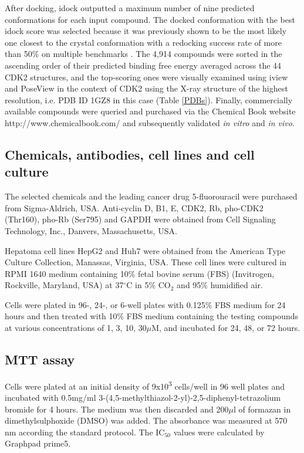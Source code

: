 \documentclass[10pt]{article}
\begin{document}
After docking, idock outputted a maximum number of nine predicted conformations for each input compound. The docked conformation with the best idock score was selected because it was previously shown to be the most likely one closest to the crystal conformation with a redocking success rate of more than 50\% on multiple benchmarks \cite{1362}. The 4,914 compounds were sorted in the ascending order of their predicted binding free energy averaged across the 44 CDK2 structures, and the top-scoring ones were visually examined using iview \cite{1366} and PoseView \cite{748} in the context of CDK2 using the X-ray structure of the highest resolution, i.e. PDB ID 1GZ8 in this case (Table \ref{PDBs}). Finally, commercially available compounds were queried and purchased via the Chemical Book website http://www.chemicalbook.com/ and subsequently validated \textit{in vitro} and \textit{in vivo}.

\subsection*{Chemicals, antibodies, cell lines and cell culture}

The selected chemicals and the leading cancer drug 5-fluorouracil were purchased from Sigma-Aldrich, USA. Anti-cyclin D, B1, E, CDK2, Rb, pho-CDK2 (Thr160), pho-Rb (Ser795) and GAPDH were obtained from Cell Signaling Technology, Inc., Danvers, Massachusetts, USA.

Hepatoma cell lines HepG2 and Huh7 were obtained from the American Type Culture Collection, Manassas, Virginia, USA. These cell lines were cultured in RPMI 1640 medium containing 10\% fetal bovine serum (FBS) (Invitrogen, Rockville, Maryland, USA) at 37$^\circ$C in 5\% CO$_2$ and 95\% humidified air.

Cells were plated in 96-, 24-, or 6-well plates with 0.125\% FBS medium for 24 hours and then treated with 10\% FBS medium containing the testing compounds at various concentrations of 1, 3, 10, 30$\mu$M, and incubated for 24, 48, or 72 hours.

\subsection*{MTT assay}

Cells were plated at an initial density of 9x10\textsuperscript{3} cells/well in 96 well plates and incubated with 0.5mg/ml 3-(4,5-methylthiazol-2-yl)-2,5-diphenyl-tetrazolium bromide for 4 hours. The medium was then discarded and 200$\mu$l of formazan in dimethylsulphoxide (DMSO) was added. The absorbance was measured at 570 nm according the standard protocol. The IC$_{50}$ values were calculated by Graphpad prime5.
\end{document}
